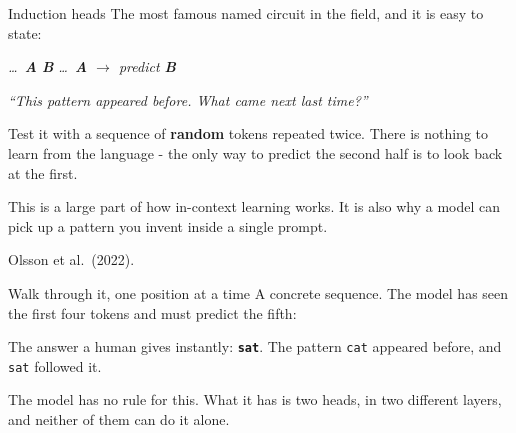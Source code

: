 \documentclass[aspectratio=169]{beamer}
\newcommand{\keybox}[1]{%
  \begin{tcolorbox}[colback=armblue!8, colframe=armblue, boxrule=0.6pt, arc=2pt]
  #1
  \end{tcolorbox}}
\newcommand{\promptbox}[1]{%
  \begin{center}
  \begin{tcolorbox}[colback=lightbg, colframe=gray, boxrule=0.5pt, arc=2pt, width=0.88\textwidth]
    \centering\textit{#1}
  \end{tcolorbox}
  \end{center}}
\begin{document}
\begin{frame}{Induction heads}
  \vspace{0.5em}
  The most famous named circuit in the field, and it is easy to state:

  \vspace{0.6em}
  \promptbox{\ldots\ \textbf{A} \textbf{B} \ldots\ \textbf{A} $\rightarrow$ predict \textbf{B}}

  \vspace{0.3em}
  \emph{``This pattern appeared before. What came next last time?''}

  \vspace{0.7em}
  Test it with a sequence of \textbf{random} tokens repeated twice. There is nothing to learn
  from the language - the only way to predict the second half is to look back at the first.

  \vspace{0.7em}
  \keybox{This is a large part of how in-context learning works. It is also why a model can
  pick up a pattern you invent inside a single prompt.}

  \vspace{0.4em}
  {\footnotesize Olsson et al.\ (2022).}
\end{frame}

\begin{frame}{Walk through it, one position at a time}
  \vspace{0.4em}
  A concrete sequence. The model has seen the first four tokens and must predict the fifth:

  \vspace{0.6em}
  \begin{center}
  \end{center}

  \vspace{0.9em}
  The answer a human gives instantly: \textbf{\texttt{sat}}. The pattern \texttt{cat} appeared
  before, and \texttt{sat} followed it.

  \vspace{0.9em}
  The model has no rule for this. What it has is two heads, in two different layers, and neither
  of them can do it alone.
\end{frame}
\end{document}

